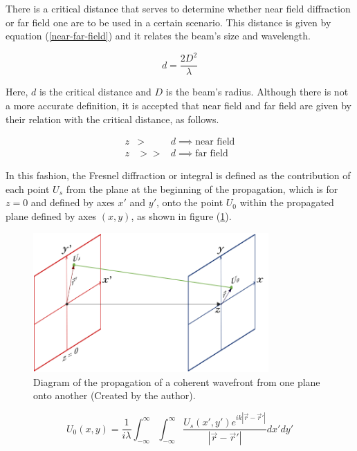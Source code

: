 There is a critical distance that serves to determine whether near field diffraction or far field one are to be used in a certain scenario. This distance is given by equation (\ref{near-far-field}) and it relates the beam's size and wavelength.

\begin{equation}
    d = \frac{2D^2}{\lambda}
    \label{near-far-field}
\end{equation}

Here, $d$ is the critical distance and $D$ is the beam's radius. Although there is not a more accurate definition, it is accepted that near field and far field are given by their relation with the critical distance, as follows.

\begin{eqnarray}
    z &>& d \implies \textrm{near field}\\
    z &>>& d \implies \textrm{far field}
\end{eqnarray}

In this fashion, the Fresnel diffraction or integral is defined as the contribution of each point $U_s$ from the plane at the beginning of the propagation, which is for $z = 0$ and defined by axes $x'$ and $y'$, onto the point $U_0$ within the propagated plane defined by axes $(x,y)$, as shown in figure (\ref{fig:Propagation_Diagram}).

\begin{figure}[htbp]
    \centering
    \includegraphics[width=9cm]{images/c02/Propagation/Propagation.png}
    \caption{Diagram of the propagation of a coherent wavefront from one plane onto another (Created by the author).}
    \label{fig:Propagation_Diagram}
\end{figure}

\begin{equation}
    U_0(x,y) = \frac{1}{i\lambda}\int_{-\infty}^{\infty}\int_{-\infty}^{\infty}\frac{U_s(x',y')e^{ik|\overrightarrow{r}-\overrightarrow{r}'|}}{|\overrightarrow{r}-\overrightarrow{r}'|}dx'dy'
    \label{Fresnel Integral}
\end{equation}

